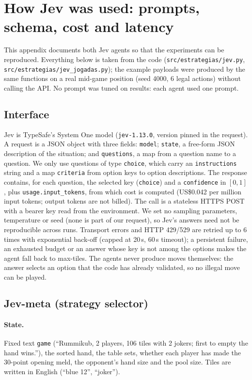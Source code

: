 \appendix
\section{How Jev was used: prompts, schema, cost and latency}\label{app:jev}
This appendix documents both Jev agents so that the experiments can be reproduced. Everything below is taken from the code (\texttt{src/estrategias/jev.py}, \texttt{src/estrategias/jev\_jogadas.py}); the example payloads were produced by the same functions on a real mid-game position (seed 4000, 6 legal actions) without calling the API. No prompt was tuned on results: each agent used one prompt.

\subsection{Interface}
Jev is TypeSafe's System One model (\texttt{jev-1.13.0}, version pinned in the request). A request is a JSON object with three fields: \texttt{model}; \texttt{state}, a free-form JSON description of the situation; and \texttt{questions}, a map from a question name to a question. We only use questions of type \texttt{choice}, which carry an \texttt{instructions} string and a map \texttt{criteria} from option keys to option descriptions. The response contains, for each question, the selected key (\texttt{choice}) and a \texttt{confidence} in $[0,1]$, plus \texttt{usage.input\_tokens}, from which cost is computed (US\$0.042 per million input tokens; output tokens are not billed). The call is a stateless HTTPS POST with a bearer key read from the environment. We set no sampling parameters, temperature or seed (none is part of our request), so Jev's answers need not be reproducible across runs. Transport errors and HTTP 429/529 are retried up to 6 times with exponential back-off (capped at 20\,s, 60\,s timeout); a persistent failure, an exhausted budget or an answer whose key is not among the options makes the agent fall back to max-tiles. The agents never produce moves themselves: the answer selects an option that the code has already validated, so no illegal move can be played.

\subsection{Jev-meta (strategy selector)}
\paragraph{State.} Fixed text \texttt{game} (``Rummikub, 2 players, 106 tiles with 2 jokers; first to empty the hand wins.''), the sorted hand, the table sets, whether each player has made the 30-point opening meld, the opponent's hand size and the pool size. Tiles are written in English (``blue 12'', ``joker'').
